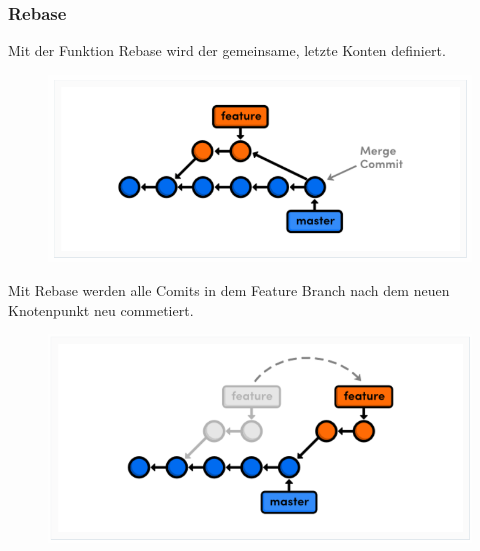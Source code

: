 \subsubsection{Rebase}
Mit der Funktion Rebase wird der gemeinsame, letzte Konten definiert. 

\begin{figure}[H]
	\centering
	\includegraphics[width=0.7\linewidth]{attachment/chapter_5/Scc039}
\end{figure}
Mit Rebase werden alle Comits in dem Feature Branch nach dem neuen Knotenpunkt neu commetiert.

\begin{figure}[H]
	\centering
	\includegraphics[width=0.7\linewidth]{attachment/chapter_5/Scc040}
\end{figure}
